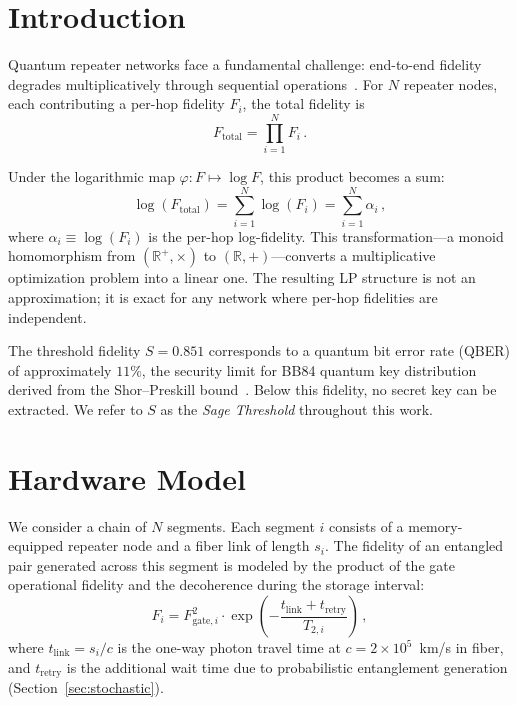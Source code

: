 \documentclass[aps,pra,reprint,amsmath,amssymb,superscriptaddress]{revtex4-2}
\begin{document}
\section{Introduction}

Quantum repeater networks face a fundamental challenge: end-to-end fidelity degrades multiplicatively through sequential operations~\cite{briegel1998,sangouard2011}. For $N$ repeater nodes, each contributing a per-hop fidelity $F_i$, the total fidelity is
\begin{equation}
F_{\text{total}} = \prod_{i=1}^{N} F_i \,.
\label{eq:multiplicative}
\end{equation}

Under the logarithmic map $\varphi: F \mapsto \log F$, this product becomes a sum:
\begin{equation}
\log(F_{\text{total}}) = \sum_{i=1}^{N} \log(F_i) = \sum_{i=1}^{N} \alpha_i \,,
\label{eq:additive}
\end{equation}
where $\alpha_i \equiv \log(F_i)$ is the per-hop log-fidelity. This transformation---a monoid homomorphism from $(\mathbb{R}^+, \times)$ to $(\mathbb{R}, +)$---converts a multiplicative optimization problem into a linear one. The resulting LP structure is not an approximation; it is exact for any network where per-hop fidelities are independent.

The threshold fidelity $S = 0.851$ corresponds to a quantum bit error rate (QBER) of approximately $11\%$, the security limit for BB84 quantum key distribution derived from the Shor--Preskill bound~\cite{shor2000}. Below this fidelity, no secret key can be extracted. We refer to $S$ as the \emph{Sage Threshold} throughout this work.


\section{Hardware Model}

We consider a chain of $N$ segments. Each segment $i$ consists of a memory-equipped repeater node and a fiber link of length $s_i$. The fidelity of an entangled pair generated across this segment is modeled by the product of the gate operational fidelity and the decoherence during the storage interval:
\begin{equation}
F_i = F_{\text{gate},i}^2 \cdot \exp\left( -\frac{t_{\text{link}} + t_{\text{retry}}}{T_{2,i}} \right) \,,
\label{eq:per_hop}
\end{equation}
where $t_{\text{link}} = s_i/c$ is the one-way photon travel time at $c = 2 \times 10^5$~km/s in fiber, and $t_{\text{retry}}$ is the additional wait time due to probabilistic entanglement generation (Section~\ref{sec:stochastic}).
\end{document}
